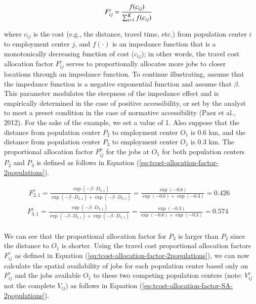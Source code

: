 \documentclass[]{elsarticle} %
\begin{document}
\begin{equation}
\label{eq:tcost-alloc-factor}
F^c_{ij} = \frac{f(c_{ij})}{\sum_{i=1}^K f(c_{ij})}\\
\end{equation}

\noindent where \(c_{ij}\) is the cost (e.g., the distance, travel time,
etc.) from population center \(i\) to employment center \(j\), and
\(f(\cdot)\) is an impedance function that is a monotonically decreasing
function of cost (\(c_{ij}\)); in other words, the travel cost
allocation factor \(F^c_{ij}\) serves to proportionally allocates more
jobs to closer locations through an impedance function. To continue
illustrating, assume that the impedance function is a negative
exponential function and assume that \(\beta\). This parameter modulates
the steepness of the impedance effect and is empirically determined in
the case of positive accessibility, or set by the analyst to meet a
preset condition in the case of normative accessibility (Paez et al.,
2012). For the sake of the example, we set a value of 1. Also suppose
that the distance from population center \(P_2\) to employment center
\(O_1\) is 0.6 km, and the distance from population center \(P_3\) to
employment center \(O_1\) is 0.3 km. The proportional allocation factor
\(F^p_{ij}\) for the jobs at \(O_1\) for both population centers \(P_2\)
and \(P_3\) is defined as follows in Equation
(\ref{eq:tcost-allocation-factor-2populations}).

\begin{equation}
\label{eq:tcost-allocation-factor-2populations}
\begin{array}{l}\
F^c_{2,1} = \frac{\exp(-\beta \cdot D_{2,1})}{\exp(-\beta \cdot D_{2,1}) + \exp(-\beta \cdot D_{3,1})} = \frac{\exp(-0.6)}{\exp(-0.6) + \exp(-0.3)} = 0.426\\
F^c_{3,1} = \frac{\exp(-\beta \cdot D_{3,1})}{\exp(-\beta \cdot D_{2,1}) + \exp(-\beta \cdot D_{3,1})}  = \frac{\exp(-0.3)}{\exp(-0.6) + \exp(-0.3)} = 0.574\\
\end{array}
\end{equation}

We can see that the proportional allocation factor for \(P_3\) is larger
than \(P_2\) since the distance to \(O_1\) is shorter. Using the travel
cost proportional allocation factors \(F^c_{ij}\) as defined in Equation
(\ref{eq:tcost-allocation-factor-2populations}), we can now calculate
the spatial availability of jobs for each population center based only
on \(F^c_{ij}\) and the jobs available \(O_1\) to these two competing
population centers (note: \(V^c_{ij}\) not the complete \(V_{ij}\)) as
follows in Equation (\ref{eq:tcost-allocation-factor-SA-2populations}).
\end{document}
